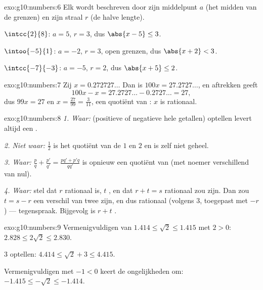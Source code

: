 \begin{solution}{exo:g10:numbers:6}
Elk  wordt beschreven door zijn middelpunt $a$ (het midden van de
grenzen) en zijn straal $r$ (de halve lengte).

$\intcc{2}{8}$: $a = 5$, $r = 3$, dus $\abs{x - 5} \leq 3$.

$\intoo{-5}{1}$: $a = -2$, $r = 3$, open grenzen, dus $\abs{x + 2} < 3$.

$\intcc{-7}{-3}$: $a = -5$, $r = 2$, dus $\abs{x + 5} \leq 2$.
\end{solution}

\begin{solution}{exo:g10:numbers:7}
Zij $x = 0.272727\dots$ Dan is $100x = 27.2727\dots$, en aftrekken geeft
\[
100x - x = 27.2727\dots - 0.2727\dots = 27,
\]
dus $99x = 27$ en $x = \frac{27}{99} = \frac{3}{11}$, een quotiënt van
: $x$ is rationaal.
\end{solution}

\begin{solution}{exo:g10:numbers:8}
\emph{1. Waar:}  (positieve of negatieve hele getallen)
optellen levert altijd een .

\emph{2. Niet waar:} $\frac{1}{2}$ is het quotiënt van de 
$1$ en $2$ en is zelf niet geheel.

\emph{3. Waar:} $\frac pq + \frac{p'}{q'} = \frac{pq' + p'q}{qq'}$ is
opnieuw een quotiënt van  (met noemer verschillend van nul).

\emph{4. Waar:} stel dat $r$ rationaal is, $t$ , en dat
$r + t = s$ rationaal zou zijn. Dan zou $t = s - r$ een verschil van twee
 zijn, en dus rationaal (volgens 3, toegepast met $-r$)
--- tegenspraak. Bijgevolg is $r + t$ .
\end{solution}

\begin{solution}{exo:g10:numbers:9}
Vermenigvuldigen van $1.414 \leq \sqrt2 \leq 1.415$ met $2 > 0$:
$2.828 \leq 2\sqrt2 \leq 2.830$.

$3$ optellen: $4.414 \leq \sqrt2 + 3 \leq 4.415$.

Vermenigvuldigen met $-1 < 0$ keert de ongelijkheden om:
$-1.415 \leq -\sqrt2 \leq -1.414$.
\end{solution}

